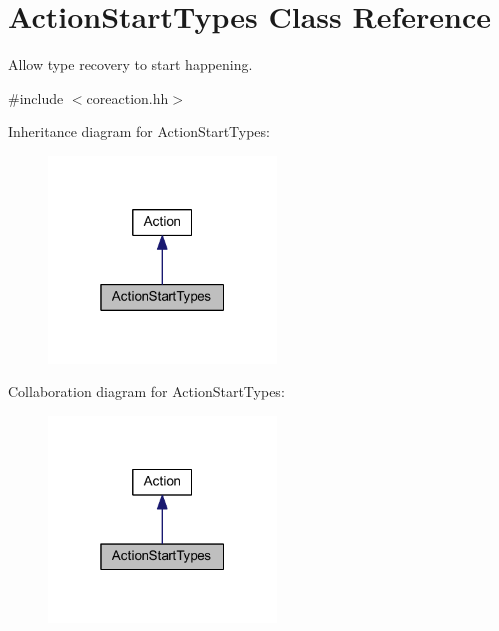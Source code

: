 \hypertarget{class_action_start_types}{}\section{Action\+Start\+Types Class Reference}
\label{class_action_start_types}


Allow type recovery to start happening.  




{\ttfamily \#include $<$coreaction.\+hh$>$}



Inheritance diagram for Action\+Start\+Types\+:
\nopagebreak
\begin{figure}[H]
\begin{center}
\leavevmode
\includegraphics[width=172pt]{class_action_start_types__inherit__graph}
\end{center}
\end{figure}


Collaboration diagram for Action\+Start\+Types\+:
\nopagebreak
\begin{figure}[H]
\begin{center}
\leavevmode
\includegraphics[width=172pt]{class_action_start_types__coll__graph}
\end{center}
\end{figure}

